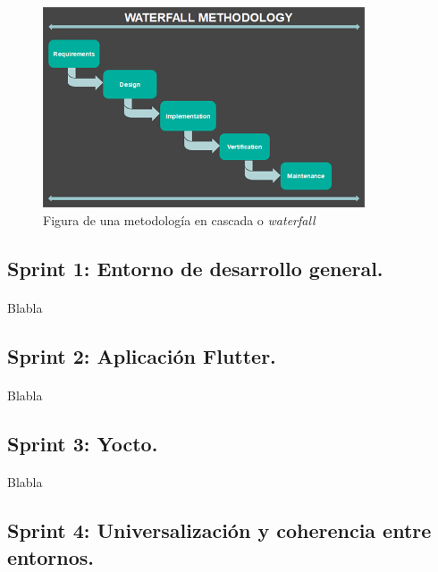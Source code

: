 \begin{figure}[H]
    \centering
    \includegraphics[width=0.85\textwidth]{imgs/waterfall}
    \caption{Figura de una metodología en cascada o \emph{waterfall}}
    \label{fig:waterfall}
\end{figure}

\subsection{Sprint 1: Entorno de desarrollo general.}

\paragraph{}Blabla

\subsection{Sprint 2: Aplicación Flutter.}

\paragraph{}Blabla

\subsection{Sprint 3: Yocto.}

\paragraph{}Blabla

\subsection{Sprint 4: Universalización y coherencia entre entornos.}

